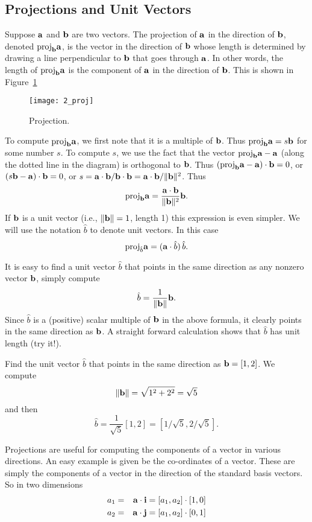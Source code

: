 \subsection{Projections and Unit Vectors}

Suppose $\aa$ and $\bb$ are two vectors. The projection of $\aa$ in
the direction of $\bb$, denoted ${\rm proj}_\bb\aa$, is the vector in
the direction of $\bb$ whose length is determined by drawing a line
perpendicular to $\bb$ that goes through $\aa$.  In other words, the
length of ${\rm proj}_\bb\aa$ is the component of $\aa$ in the
direction of $\bb$. This is shown in Figure~\ref{fig_proj}

\begin{figure}
\centerline{\texttt{[image: 2\_proj]}}
\caption{Projection. \label{fig_proj}}
\end{figure}

To compute ${\rm proj}_\bb\aa$, we first note that it is a multiple of
$\bb$.  Thus ${\rm proj}_\bb\aa = s\bb$ for some number $s$. To
compute $s$, we use the fact that the vector ${\rm proj}_\bb\aa - \aa$
(along the dotted line in the diagram) is orthogonal to $\bb$. Thus
$({\rm proj}_\bb\aa - \aa)\cdot\bb = 0$, or $(s\bb-\aa)\cdot\bb=0$, or
$s = \aa\cdot\bb / \bb\cdot\bb = \aa\cdot\bb / \|\bb\|^2$. Thus
\begin{equation}
\label{eq:projection}
{\rm proj}_\bb\aa = {{\aa\cdot\bb}\over{\|\bb\|^2}}\bb.
\end{equation}
If $\bb$ is a unit vector (i.e., $\|\bb\|=1$, length 1) this expression is even
simpler. We will use the notation $\hat{b}$ to denote unit vectors. In this case
\[
{\rm proj}_{\hat{b}} \aa = (\aa\cdot\hat{b})\,\hat{b}.
\]

It is easy to find a unit vector $\hat{b}$ that points in the same direction as any nonzero 
vector $\bb$, simply compute 
\[
\hat{b} = \frac{1}{\| \bb \|} \bb.
\]
Since $\hat{b}$ is a (positive) scalar multiple of $\bb$ in the above formula, it clearly points in the
same direction as $\bb$. A straight forward calculation shows that $\hat{b}$ has unit length 
(try it!). 

\begin{example}
Find the unit vector $\hat{b}$ that points in the same direction as $\bb = [1, 2]$.
{\rm We compute 
\[
\| \bb \| = \sqrt{1^2 + 2^2} = \sqrt{5}
\]
and then 
\[
\hat{b} = \frac{1}{\sqrt{5}} [1,2] = [1/\sqrt{5}, 2/\sqrt{5}]. 
\]} 
\end{example}

Projections are useful for computing the components of a vector in
various directions. An easy example is given be the co-ordinates of a
vector. These are simply the components of a vector in the direction
of the standard basis vectors. So in two dimensions
\begin{eqnarray*}
a_1 & = & \aa\cdot{\bf i} = [a_1,a_2]\cdot[1,0] \\
a_2 & = & \aa\cdot{\bf j} = [a_1,a_2]\cdot[0,1]
\end{eqnarray*}


